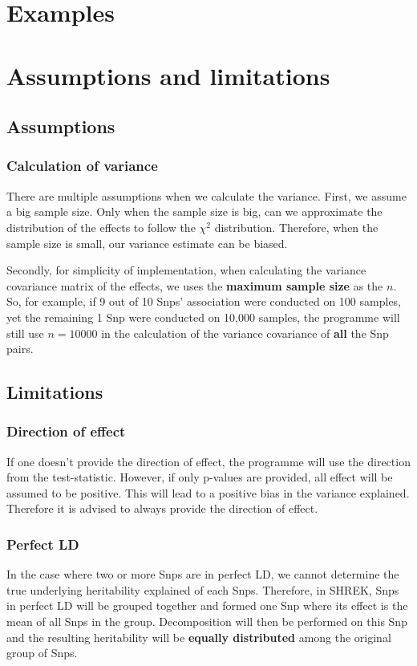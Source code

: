 \documentclass[12pt,a4paper,twoside]{report}
\begin{document}
\chapter{Examples}
\chapter{Assumptions and limitations}
\section{Assumptions}
\subsection{Calculation of variance}
There are multiple assumptions when we calculate the variance. 
First, we assume a big sample size. Only when the sample size is big, can we approximate the distribution of the effects to follow the $\chi^2$ distribution. 
Therefore, when the sample size is small, our variance estimate can be biased.

Secondly, for simplicity of implementation, when calculating the variance covariance matrix of the effects, we uses the \textbf{maximum sample size} as the $n$.
So, for example, if 9 out of 10 Snps' association were conducted on 100 samples, yet the remaining 1 Snp were conducted on 10,000 samples, the programme will still use $n= 10000$ in the calculation of the variance covariance of \textbf{all} the Snp pairs.
\section{Limitations}
\subsection{Direction of effect}
If one doesn't provide the direction of effect, the programme will use the direction from the test-statistic. 
However, if only p-values are provided, all effect will be assumed to be positive. 
This will lead to a positive bias in the variance explained.
Therefore it is advised to always provide the direction of effect.
\subsection{Perfect LD}
In the case where two or more Snps are in perfect LD, we cannot determine the true underlying heritability explained of each Snps.
Therefore, in SHREK, Snps in perfect LD will be grouped together and formed one Snp where its effect is the mean of all Snps in the group.
Decomposition will then be performed on this Snp and the resulting heritability will be \textbf{equally distributed} among the original group of Snps.
\end{document}
